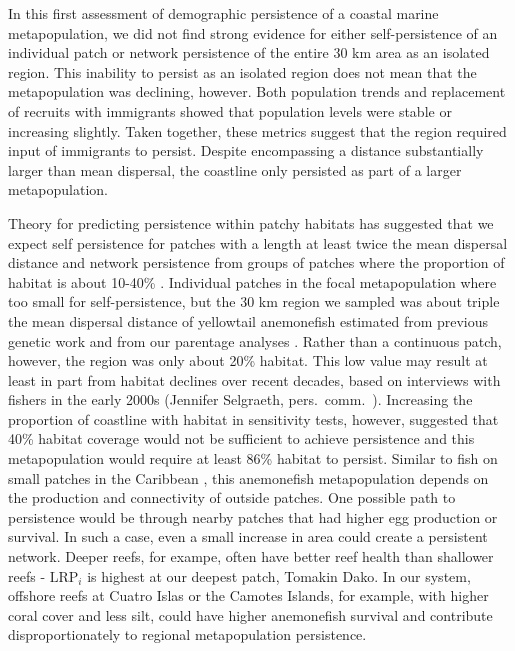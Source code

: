 \documentclass[12pt, oneside]{article}   	%
\begin{document}
In this first assessment of demographic persistence of a coastal marine metapopulation, we did not find strong evidence for either self-persistence of an individual patch or network persistence of the entire 30 km area as an isolated region. This inability to persist as an isolated region does not mean that the metapopulation was declining, however. Both population trends and replacement of recruits with immigrants showed that population levels were stable or increasing slightly. Taken together, these metrics suggest that the region required input of immigrants to persist. Despite encompassing a distance substantially larger than mean dispersal, the coastline only persisted as part of a larger metapopulation.

Theory for predicting persistence within patchy habitats has suggested that we expect self persistence for patches with a length at least twice the mean dispersal distance \citep{lockwood2002effects} and network persistence from groups of patches where the proportion of habitat is about 10-40\% \citep[depending on the particular species, population, and the steepness of the stock-recruit curve, ][]{botsford2019population}. Individual patches in the focal metapopulation where too small for self-persistence, but the 30 km region we sampled was about triple the mean dispersal distance of yellowtail anemonefish estimated from previous genetic work \citep[around 9 km,][]{pinsky2010using} and from our parentage analyses \citep[8.2 km,][]{catalanoInPrepconnectivity}. Rather than a continuous patch, however, the region was only about 20\% habitat. This low value may result at least in part from habitat declines over recent decades, based on interviews with fishers in the early 2000s (Jennifer Selgraeth, pers.\ comm.\ ). Increasing the proportion of coastline with habitat in sensitivity tests, however, suggested that 40\% habitat coverage would not be sufficient to achieve persistence and this metapopulation would require at least 86\% habitat to persist. Similar to fish on small patches in the Caribbean \citep{johnson2018integrating}, this anemonefish metapopulation depends on the production and connectivity of outside patches. One possible path to persistence would be through nearby patches that had higher egg production or survival. In such a case, even a small increase in area could create a persistent network. Deeper reefs, for exampe, often have better reef health than shallower reefs \citep{cinner2016bright} - $\text{LRP}_i$ is highest at our deepest patch, Tomakin Dako. In our system, offshore reefs at Cuatro Islas or the Camotes Islands, for example, with higher coral cover and less silt, could have higher anemonefish survival and contribute disproportionately to regional metapopulation persistence.
\end{document}
